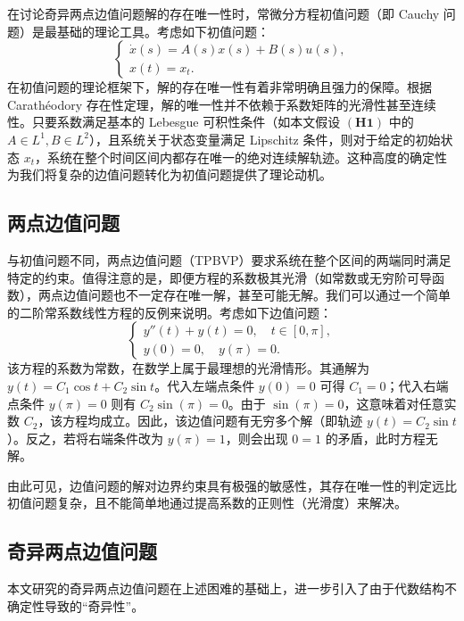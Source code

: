 \documentclass{GZUbachelorthesis}
\begin{document}
在讨论奇异两点边值问题解的存在唯一性时，常微分方程初值问题（即 Cauchy 问题）是最基础的理论工具。考虑如下初值问题：
\begin{equation}
	\begin{cases}
		\dot{x}(s) = A(s)x(s) + B(s)u(s), \\
		x(t) = x_t.
	\end{cases}
\end{equation}
在初值问题的理论框架下，解的存在唯一性有着非常明确且强力的保障。根据 Carathéodory 存在性定理，解的唯一性并不依赖于系数矩阵的光滑性甚至连续性。只要系数满足基本的 Lebesgue 可积性条件（如本文假设 $\mathbf{(H1)}$ 中的 $A \in L^1, B \in L^2$），且系统关于状态变量满足 Lipschitz 条件，则对于给定的初始状态 $x_t$，系统在整个时间区间内都存在唯一的绝对连续解轨迹。这种高度的确定性为我们将复杂的边值问题转化为初值问题提供了理论动机。

\subsection{两点边值问题}

与初值问题不同，两点边值问题（TPBVP）要求系统在整个区间的两端同时满足特定的约束。值得注意的是，即便方程的系数极其光滑（如常数或无穷阶可导函数），两点边值问题也不一定存在唯一解，甚至可能无解。我们可以通过一个简单的二阶常系数线性方程的反例来说明。考虑如下边值问题：
\begin{equation}\label{ex:sin}
	\begin{cases}
		y''(t) + y(t) = 0, \quad t \in [0, \pi], \\
		y(0) = 0, \quad y(\pi) = 0.
	\end{cases}
\end{equation}
该方程的系数为常数，在数学上属于最理想的光滑情形。其通解为 $y(t) = C_1 \cos t + C_2 \sin t$。代入左端点条件 $y(0)=0$ 可得 $C_1=0$；代入右端点条件 $y(\pi)=0$ 则有 $C_2 \sin(\pi) = 0$。由于 $\sin(\pi)=0$，这意味着对任意实数 $C_2$，该方程均成立。因此，该边值问题有无穷多个解（即轨迹 $y(t) = C_2 \sin t$）。反之，若将右端条件改为 $y(\pi)=1$，则会出现 $0=1$ 的矛盾，此时方程无解。

由此可见，边值问题的解对边界约束具有极强的敏感性，其存在唯一性的判定远比初值问题复杂，且不能简单地通过提高系数的正则性（光滑度）来解决。

\subsection{奇异两点边值问题}

本文研究的奇异两点边值问题在上述困难的基础上，进一步引入了由于代数结构不确定性导致的“奇异性”。
\end{document}
